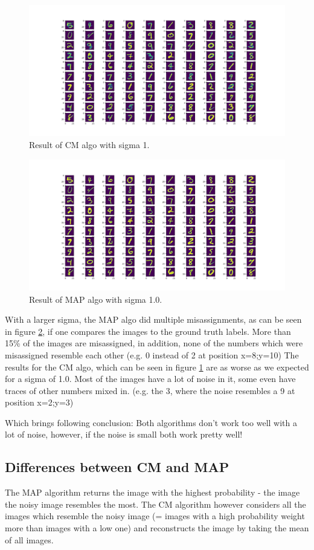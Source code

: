 \documentclass{article}
\begin{document}
\begin{figure}[h]
  \includegraphics[width=\linewidth]{sigma_100_cm.png}
  \caption{Result of CM algo with sigma 1.}
  \label{fig:cm100}
\end{figure}

\begin{figure}[h]
  \includegraphics[width=\linewidth]{sigma_100_map.png}
  \caption{Result of MAP algo with sigma 1.0.}
  \label{fig:map100}
\end{figure}

With a larger sigma, the MAP algo did multiple misassignments, as can be seen in figure \ref{fig:map100}, if one compares the images to the ground truth labels. More than 15\% of the images are misassigned, in addition, none of the numbers which were misassigned resemble each other (e.g. 0 instead of 2 at position x=8;y=10)
The results for the CM algo, which can be seen in figure \ref{fig:cm100} are as worse as we expected for a sigma of 1.0. Most of the images have a lot of noise in it, some even have traces of other numbers mixed in. (e.g. the 3, where the noise resembles a 9 at position x=2;y=3)

Which brings following conclusion: Both algorithms don't work too well with a lot of noise, however, if the noise is small both work pretty well!
\pagebreak

\subsection{Differences between CM and MAP}

The MAP algorithm returns the image with the highest probability - the image the noisy image resembles the most. The CM algorithm however considers all the images which resemble the noisy image (= images with a high probability weight more than images with a low one) and reconstructs the image by taking the mean of all images.
\end{document}
